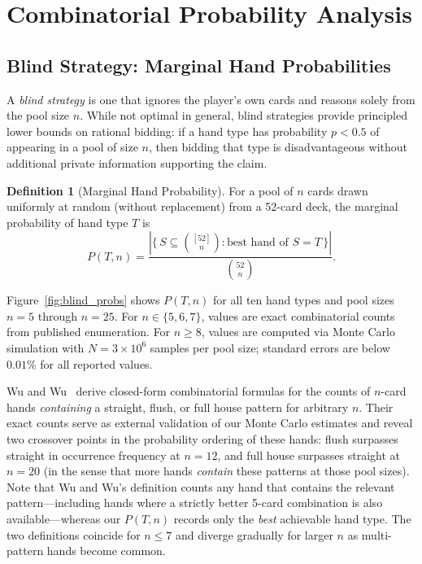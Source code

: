 \documentclass[11pt, a4paper]{article}
\theoremstyle{definition}
\newtheorem{definition}{Definition}
\begin{document}
\section{Combinatorial Probability Analysis}
\label{sec:prob}

\subsection{Blind Strategy: Marginal Hand Probabilities}
\label{sec:blind}

A \emph{blind strategy} is one that ignores the player's own cards and reasons solely
from the pool size $n$. While not optimal in general, blind strategies provide
principled lower bounds on rational bidding: if a hand type has probability $p < 0.5$
of appearing in a pool of size $n$, then bidding that type is disadvantageous without
additional private information supporting the claim.

\begin{definition}[Marginal Hand Probability]
For a pool of $n$ cards drawn uniformly at random (without replacement) from a
52-card deck, the marginal probability of hand type $T$ is
\[
P(T, n) = \frac{|\{\,S \subseteq \binom{[52]}{n} : \text{best hand of } S = T\,\}|}{\binom{52}{n}}.
\]
\end{definition}

Figure~\ref{fig:blind_probs} shows $P(T, n)$ for all ten hand types and pool sizes
$n = 5$ through $n = 25$. For $n \in \{5, 6, 7\}$, values are exact combinatorial
counts from published enumeration. For $n \geq 8$, values are computed via Monte Carlo
simulation with $N = 3 \times 10^6$ samples per pool size; standard errors are below
$0.01\%$ for all reported values.

Wu and Wu~\cite{wu2024ncard} derive closed-form combinatorial formulas for the counts
of $n$-card hands \emph{containing} a straight, flush, or full house pattern for
arbitrary $n$. Their exact counts serve as external validation of our Monte Carlo
estimates and reveal two crossover points in the probability ordering of these hands:
flush surpasses straight in occurrence frequency at $n = 12$, and full house surpasses
straight at $n = 20$ (in the sense that more hands \emph{contain} these patterns at
those pool sizes).
Note that Wu and Wu's definition counts any hand that contains the relevant pattern---including
hands where a strictly better 5-card combination is also available---whereas our $P(T,n)$
records only the \emph{best} achievable hand type. The two definitions coincide for
$n \leq 7$ and diverge gradually for larger $n$ as multi-pattern hands become common.
\end{document}
